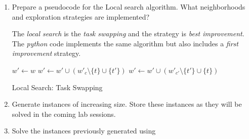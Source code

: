 \documentclass[12pt, a4paper]{article}
\begin{document}
\begin{enumerate}[label=(\alph*)]
    \item Prepare a pseudocode for the Local search algorithm. What neighborhoods and exploration strategies are implemented?

    The \textit{local search} is the \textit{task swapping} and the strategy is \textit{best improvement}. The \textit{python} code implements the same algorithm but also includes a \textit{first improvement} strategy.

    \begin{algorithm}[H]
      \SetAlgoLined
      \DontPrintSemicolon
      $w' \leftarrow w$\;
      $w' \leftarrow w' \cup (w'_{c} \setminus \{ t \} \cup \{ t' \})$\;
      $w' \leftarrow w' \cup (w'_{c'} \setminus \{ t' \} \cup \{ t \})$\;
      \;
      \caption{Local Search: Task Swapping}
    \end{algorithm}
   

    \item Generate instances of increasing size. Store these instances as they will be solved in the coming lab sessions.

    \item Solve the instances previously generated using


\end{enumerate}
\end{document}
